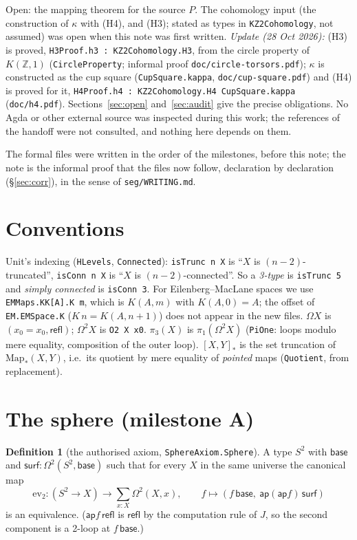 \documentclass[11pt]{amsart}
\theoremstyle{definition}
\newtheorem{definition}[theorem]{Definition}
\theoremstyle{remark}
\newcommand{\Om}{\Omega}
\newcommand{\Map}{\mathrm{Map}_*}
\newcommand{\Z}{\mathbb{Z}}
\newcommand{\hc}[2]{[#1,#2]_*}
\newcommand{\code}[1]{\texttt{#1}}
\begin{document}
Open: the mapping theorem for the source $P$. The cohomology input
(the construction of $\kappa$ with (H4), and (H3); stated as types in
\code{KZ2Cohomology}, not assumed) was open when this note was first
written. \emph{Update (28 Oct 2026):} (H3) is proved,
\code{H3Proof.h3 : KZ2Cohomology.H3}, from the circle property of $K(\Z,1)$
(\code{CircleProperty}; informal proof \code{doc/circle-torsors.pdf});
$\kappa$ is constructed as the cup square (\code{CupSquare.kappa},
\code{doc/cup-square.pdf}) and (H4) is proved for it,
\code{H4Proof.h4 : KZ2Cohomology.H4 CupSquare.kappa} (\code{doc/h4.pdf}). Sections~\ref{sec:open} and~\ref{sec:audit} give
the precise obligations. No Agda or other external source was inspected
during this work; the references of the handoff were not consulted, and
nothing here depends on them.

The formal files were written in the order of the milestones, before this
note; the note is the informal proof that the files now follow,
declaration by declaration (\S\ref{sec:corr}), in the sense of
\code{seg/WRITING.md}.

\section{Conventions}

Unit's indexing (\code{HLevels}, \code{Connected}): \code{isTrunc n X} is
``$X$ is $(n-2)$-truncated'', \code{isConn n X} is ``$X$ is
$(n-2)$-connected''. So a \emph{3-type} is \code{isTrunc 5} and
\emph{simply connected} is \code{isConn 3}. For Eilenberg--MacLane spaces
we use \code{EMMaps.KK[A].K m}, which is $K(A,m)$ with $K(A,0)=A$; the
offset of \code{EM.EMSpace.K} ($K\,n=K(A,n+1)$) does not appear in the new
files. $\Om X$ is $(x_0=x_0,\mathsf{refl})$; $\Om^2X$ is \code{O2 X x0}.
$\pi_3(X)$ is $\pi_1(\Om^2X)$ (\code{PiOne}: loops modulo mere equality,
composition of the outer loop). $\hc XY$ is the set truncation of
$\Map(X,Y)$, i.e.\ its quotient by mere equality of \emph{pointed} maps
(\code{Quotient}, from replacement).

\section{The sphere (milestone A)}

\begin{definition}[the authorised axiom, \code{SphereAxiom.Sphere}]
A type $S^2$ with $\mathsf{base}$ and $\mathsf{surf}:\Om^2(S^2,\mathsf{base})$
such that for every $X$ in the same universe the canonical map
\[\mathrm{ev}_2:(S^2\to X)\to\textstyle\sum_{x:X}\Om^2(X,x),\qquad
  f\mapsto(f\,\mathsf{base},\ \mathsf{ap}(\mathsf{ap}f)\,\mathsf{surf})\]
is an equivalence. ($\mathsf{ap}f\,\mathsf{refl}$ is $\mathsf{refl}$ by
the computation rule of $J$, so the second component is a 2-loop at
$f\,\mathsf{base}$.)
\end{definition}
\end{document}
